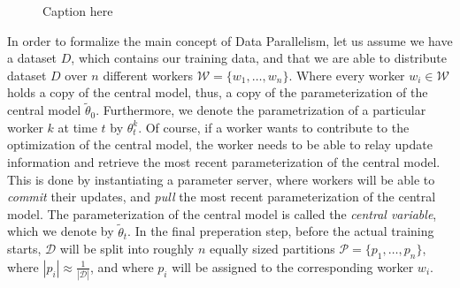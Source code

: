 \begin{figure}[H]
  \caption{Caption here}
  \label{fig:minibatch_data_parallelism}
\end{figure}

In order to formalize the main concept of Data Parallelism, let us assume we have a dataset $D$, which contains our training data, and that we are able to distribute dataset $D$ over $n$ different workers $\mathcal{W} = \{w_1, \ldots, w_n\}$. Where every worker $w_i \in \mathcal{W}$ holds a copy of the central model, thus, a copy of the parameterization of the central model $\tilde{\theta}_0$. Furthermore, we denote the parametrization of a particular worker $k$ at time $t$ by $\theta_t^k$. Of course, if a worker wants to contribute to the optimization of the central model, the worker needs to be able to relay update information and retrieve the most recent parameterization of the central model. This is done by instantiating a parameter server, where workers will be able to \emph{commit} their updates, and \emph{pull} the most recent parameterization of the central model. The parameterization of the central model is called the \emph{central variable}, which we denote by $\tilde{\theta}_t$. In the final preperation step, before the actual training starts, $\mathcal{D}$ will be split into roughly $n$ equally sized partitions $\mathcal{P} = \{p_1, \ldots, p_n\}$, where $\left\vert{p_i}\right\vert \approx \frac{1}{\left\vert{\mathcal{D}}\right\vert}$, and where $p_i$ will be assigned to the corresponding worker $w_i$.\\

